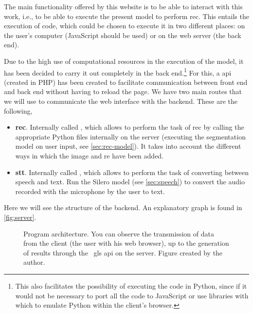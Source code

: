 The main functionality offered by this website is to be able to interact with
this work, i.e., to be able to execute the present model to perform
\gls{rec}. This entails the execution of code, which could be chosen to execute
it in two different places: on the user's computer (JavaScript should be used)
or on the web server (the back end).

Due to the high use of computational resources in the execution of the model,
it has been decided to carry it out completely in the back end.\footnote{This
  also facilitates the possibility of executing the code in Python, since if it
  would not be necessary to port all the code to JavaScript or use libraries
  with which to emulate Python within the client's browser.} For this, a
\gls{api} (created in PHP) has been created to facilitate communication between
front end and back end without having to reload the page. We have two main
routes that we will use to communicate the web interface with the
backend. These are the following,
\begin{itemize}
  \item \textbf{\gls*{rec}}. Internally called , which
  allows to perform the task of \gls{rec} by calling the appropriate Python
  files internally on the server (executing the segmentation model on user
  input, see \vref{sec:rec-model}). It takes into account the different ways in
  which the image and \gls{re} have been added.
  \item \textbf{\gls*{stt}}. Internally called , which allows
  to perform the task of converting between speech and text. Run the Silero
  model (see \vref{sec:speech}) to convert the audio recorded with the
  microphone by the user to text.
\end{itemize}

Here we will see the structure of the backend. An explanatory graph is found in
\vref{fig:server}.

\begin{figure}[p]
  \centering
  \resizebox{\textwidth}{!}{}
  \caption[Program architecture]{Program architecture. You can observe the
    transmission of data from the client (the user with his web browser), up to
    the generation of results through the \ gls {api} on the server. Figure
    created by the author.}\label{fig:server}
\end{figure}
